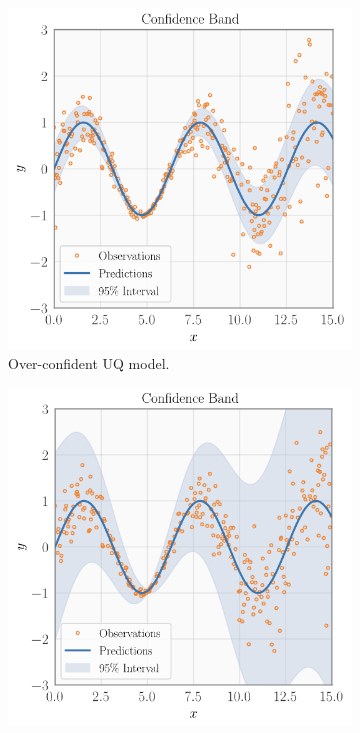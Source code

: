 \begin{figure}
     \centering
     \begin{subfigure}[b]{0.32\textwidth}
         \centering
         \includegraphics[width=\textwidth]{figures/intro/example-under.png}
         \caption{Over-confident UQ model.}
     \end{subfigure}
     \hfill
     \begin{subfigure}[b]{0.32\textwidth}
         \centering
         \includegraphics[width=\textwidth]{figures/intro/example-over.png}

\end{subfigure}
\end{figure}
